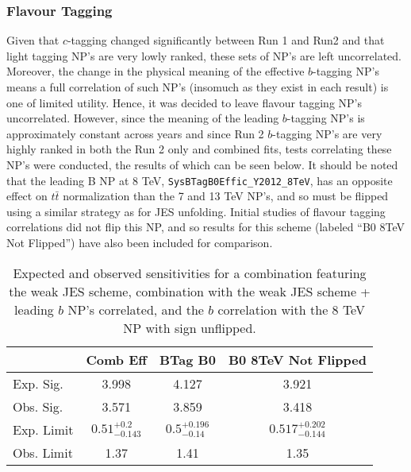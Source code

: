 \subsubsection{Flavour Tagging}
Given that $c$-tagging changed significantly between Run 1 and Run2 and that light tagging NP's are very lowly ranked, these sets of NP's are left uncorrelated.  Moreover, the change in the physical meaning of the effective $b$-tagging NP's means a full correlation of such NP's (insomuch as they exist in each result) is one of limited utility.  Hence, it was decided to leave flavour tagging NP's uncorrelated.  However, since the meaning of the leading $b$-tagging NP's is approximately constant across years and since Run 2 $b$-tagging NP's are very highly ranked in both the Run 2 only and combined fits, tests correlating these NP's were conducted, the results of which can be seen below.  It should be noted that the leading B NP at 8 TeV, \texttt{SysBTagB0Effic\_Y2012\_8TeV}, has an opposite effect on $t\bar{t}$ normalization than the 7 and 13 TeV NP's, and so must be flipped using a similar strategy as for JES unfolding.  Initial studies of flavour tagging correlations did not flip this NP, and so results for this scheme (labeled ``B0 8TeV Not Flipped'') have also been included for comparison.

\begin{table}[htbp]
\begin{center}\begin{tabular}{lccc}
\hline\hline
 & Comb Eff & BTag B0 & B0 8TeV Not Flipped\\
\hline
Exp. Sig. & 3.998 & 4.127 & 3.921\\
Obs. Sig. &  3.571 & 3.859 & 3.418\\ %
\hline
Exp. Limit & $0.51^{+0.2}_{-0.143}$ & $0.5^{+0.196}_{-0.14}$ & $0.517^{+0.202}_{-0.144}$\\
Obs. Limit & 1.37 & 1.41 & 1.35\\
\hline
\end{tabular}
\caption{Expected and observed sensitivities for a combination featuring the weak JES scheme, combination with the weak JES scheme + leading $b$ NP's correlated, and the $b$ correlation with the 8 TeV NP with sign unflipped.}
\label{tab:ExpectedSensitivities:btag-b}
\end{center}
\end{table}

